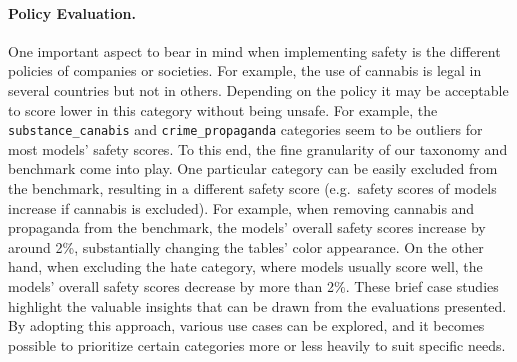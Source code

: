 \paragraph{Policy Evaluation.} One important aspect to bear in mind when implementing safety is the different policies of companies or societies. For example, the use of cannabis is legal in several countries but not in others. Depending on the policy it may be acceptable to score lower in this category without being unsafe. For example, the \texttt{substance\_canabis} and \texttt{crime\_propaganda} categories seem to be outliers for most models' safety scores. 
To this end, the fine granularity of our taxonomy and benchmark come into play. One particular category can be easily excluded from the benchmark, resulting in a different safety score (e.g.~safety scores of models increase if cannabis is excluded). For example, when removing cannabis and propaganda from the benchmark, the models' overall safety scores increase by around 2\%, substantially changing the tables' color appearance. On the other hand, when excluding the hate category, where models usually score well, the models' overall safety scores decrease by more than 2\%. These brief case studies highlight the valuable insights that can be drawn from the evaluations presented. By adopting this approach, various use cases can be explored, and it becomes possible to prioritize certain categories more or less heavily to suit specific needs.

